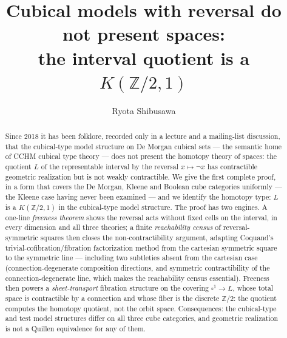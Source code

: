 \documentclass[11pt]{amsart}
\theoremstyle{definition}
\newcommand{\Ldash}{L}
\begin{document}
\title[The reversal quotient is a $K(\mathbb{Z}/2,1)$]{Cubical
  models with reversal do not present spaces:\\ the interval
  quotient is a $K(\mathbb{Z}/2, 1)$}

\author{Ryota Shibusawa}
\address{Daiichi Institute of Technology, Japan}


\begin{abstract}
  Since 2018 it has been folklore, recorded only in a lecture and a
  mailing-list discussion, that the cubical-type model structure on
  De Morgan cubical sets --- the semantic home of CCHM cubical type
  theory --- does not present the homotopy theory of spaces: the
  quotient $\Ldash$ of the representable interval by the reversal
  $x \mapsto \neg x$ has contractible geometric realization but is
  not weakly contractible.  We give the first complete proof, in a
  form that covers the De Morgan, Kleene and Boolean cube categories
  uniformly --- the Kleene case having never been examined --- and
  we identify the homotopy type: $\Ldash$ is a
  $K(\mathbb{Z}/2, 1)$ in the cubical-type model structure.  The
  proof has two engines.  A one-line \emph{freeness theorem} shows
  the reversal acts without fixed cells on the interval, in every
  dimension and all three theories; a finite \emph{reachability
  census} of reversal-symmetric squares then closes the
  non-contractibility argument, adapting Coquand's
  trivial-cofibration/fibration factorization method from the
  cartesian symmetric square to the symmetric line --- including two
  subtleties absent from the cartesian case (connection-degenerate
  composition directions, and symmetric contractibility of the
  connection-degenerate line, which makes the reachability census
  essential).  Freeness then powers a \emph{sheet-transport}
  fibration structure on the covering $\square^1 \to \Ldash$, whose
  total space is contractible by a connection and whose fiber is the
  discrete $\mathbb{Z}/2$: the quotient computes the homotopy
  quotient, not the orbit space.  Consequences: the cubical-type and
  test model structures differ on all three cube categories, and
  geometric realization is not a Quillen equivalence for any of
  them.
\end{abstract}
\end{document}
